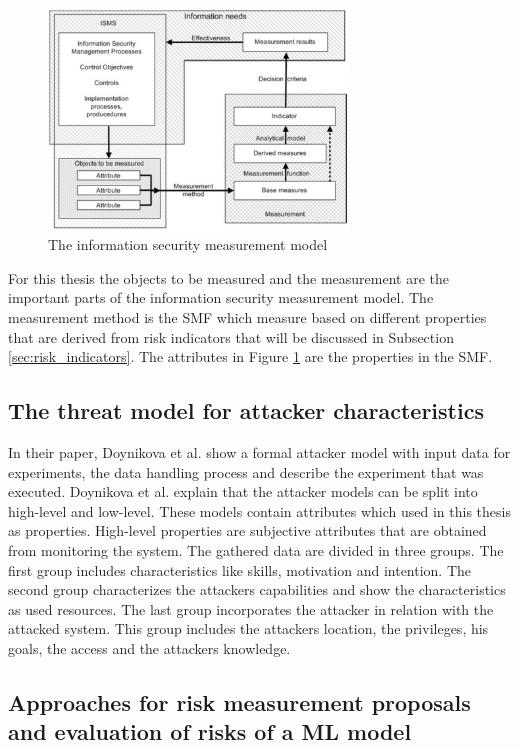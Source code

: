 \begin{figure}[h!]
  \centering
  \includegraphics[width=8cm]{pictures/is_measurement_model.jpg}
  \caption{The information security measurement model \cite{tarnes2012information}}
  \label{fig:is_measurement_model}
\end{figure}

For this thesis the objects to be measured and the measurement are the important parts of the information security measurement model. The measurement method is the SMF which measure based on different properties that are derived from risk indicators that will be discussed in Subsection \ref{sec:risk_indicators}. The attributes in Figure \ref{fig:is_measurement_model} are the properties in the SMF.

\subsection{The threat model for attacker characteristics}

In their paper, Doynikova et al. \cite{DBLP:conf/crisis/DoynikovaNGK20} show a formal attacker model with input data for experiments, the data handling process and describe the experiment that was executed. Doynikova et al. explain that the attacker models can be split into high-level and low-level. These models contain attributes which used in this thesis as properties. High-level properties are subjective attributes that are obtained from monitoring the system. The gathered data are divided in three groups. The first group includes characteristics like skills, motivation and intention. The second group characterizes the attackers capabilities and show the characteristics as used resources. The last group incorporates the attacker in relation with the attacked system. This group includes the attackers location, the privileges, his goals, the access and the attackers knowledge.

\subsection{Approaches for risk measurement proposals and evaluation of risks of a ML model}
\label{sec:approaches}

